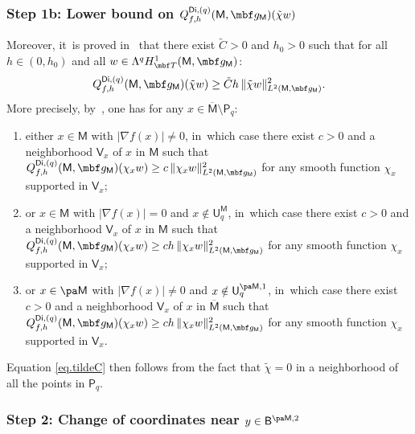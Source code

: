 \subsubsection*{Step 1b: Lower bound on $Q_{f,h}^{\mathsf{Di},(q)}(\mathsf M,\mbf g_{\mathsf M})(\tilde \chi w)$} Moreover, it~is proved
in~\cite[\S3.4]{helffer-nier-06} that there exist $\tilde C>0$ and $h_0>0$ such that for all $h\in (0,h_0)$ and all $w\in \Lambda^qH^1_{\mbf T}(\mathsf M,\mbf g_{\mathsf M})$:
\begin{equation}\label{eq.tildeC}
Q_{f,h}^{\mathsf{Di},(q)}(\mathsf M,\mbf g_{\mathsf M})(\tilde \chi w)\ge \tilde Ch\, \Vert\tilde \chi w \Vert_{L^2(\mathsf M,\mbf g_{\mathsf M})}^2.
\end{equation}
More precisely, by~\cite[\S3.4]{helffer-nier-06}, one has for any $x\in \overline{\mathsf M}\setminus \mathsf P_q$:
\begin{enumerate}
\item\label{step:1b1}
either $x\in \mathsf M$ with $\vert \nabla f(x)\vert \neq 0$, in~which case there exist $c>0$ and a neighborhood $\mathsf V_x$ of $x$ in $\mathsf M$ such that $Q_{f,h}^{\mathsf{Di},(q)}(\mathsf M,\mbf g_{\mathsf M})(\chi_x w)\ge c\, \Vert \chi_x w \Vert_{L^2(\mathsf M,\mbf g_{\mathsf M})}^2$ for any smooth function $\chi_x$ supported in $\mathsf V_x$;
\item\label{step:1b2}
or $x\in \mathsf M$ with $\vert \nabla f(x)\vert = 0$ and $x\notin \mathsf U_q^{\mathsf M}$, in~which case there exist $c>0$ and a neighborhood $\mathsf V_x$ of $x$ in $\mathsf M$ such that $Q_{f,h}^{\mathsf{Di},(q)}(\mathsf M,\mbf g_{\mathsf M})(\chi_x w)\ge ch\, \Vert \chi_x w \Vert_{L^2(\mathsf M,\mbf g_{\mathsf M})}^2$ for any smooth function $\chi_x$ supported in $\mathsf V_x$;
\item\label{step:1b3}
or $x\in \pa \mathsf M$ with $\vert \nabla f(x)\vert \neq 0$ and $x\notin \mathsf U^{\pa \mathsf M,1}_q$, in~which case there exist $c>0$ and a neighborhood $\mathsf V_x$ of $x$ in $\overline{\mathsf M}$ such that $Q_{f,h}^{\mathsf{Di},(q)}(\mathsf M,\mbf g_{\mathsf M})(\chi_x w)\ge ch\, \Vert \chi_x w \Vert_{L^2(\mathsf M,\mbf g_{\mathsf M})}^2$ for any smooth function $\chi_x$ supported in $\mathsf V_x$.
\end{enumerate}
Equation \eqref{eq.tildeC} then follows from the fact that $\tilde \chi=0$ in a neighborhood of
all the points in $\mathsf P_q$.

\subsubsection*{Step 2: Change of coordinates near $y\in \mathsf B^{\pa \mathsf M,2}$}

